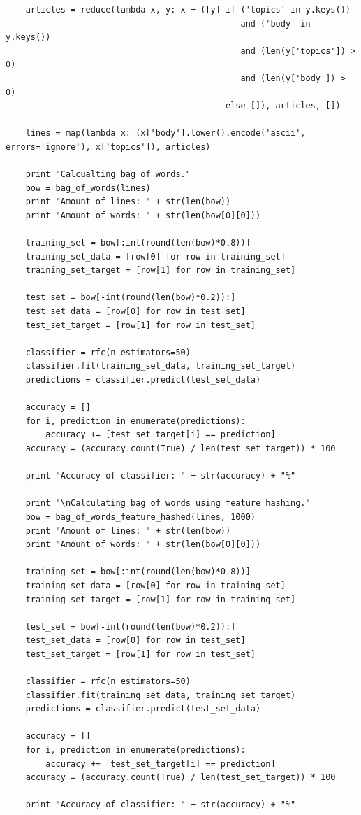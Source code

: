 \documentclass{article}
\begin{document}
\begin{lstlisting}
    articles = reduce(lambda x, y: x + ([y] if ('topics' in y.keys())
                                               and ('body' in y.keys())
                                               and (len(y['topics']) > 0)
                                               and (len(y['body']) > 0)
                                            else []), articles, [])

    lines = map(lambda x: (x['body'].lower().encode('ascii', errors='ignore'), x['topics']), articles)

    print "Calcualting bag of words."
    bow = bag_of_words(lines)
    print "Amount of lines: " + str(len(bow))
    print "Amount of words: " + str(len(bow[0][0]))

    training_set = bow[:int(round(len(bow)*0.8))]
    training_set_data = [row[0] for row in training_set]
    training_set_target = [row[1] for row in training_set]

    test_set = bow[-int(round(len(bow)*0.2)):]
    test_set_data = [row[0] for row in test_set]
    test_set_target = [row[1] for row in test_set]

    classifier = rfc(n_estimators=50)
    classifier.fit(training_set_data, training_set_target)
    predictions = classifier.predict(test_set_data)

    accuracy = []
    for i, prediction in enumerate(predictions):
        accuracy += [test_set_target[i] == prediction]
    accuracy = (accuracy.count(True) / len(test_set_target)) * 100

    print "Accuracy of classifier: " + str(accuracy) + "%"

    print "\nCalculating bag of words using feature hashing."
    bow = bag_of_words_feature_hashed(lines, 1000)
    print "Amount of lines: " + str(len(bow))
    print "Amount of words: " + str(len(bow[0][0]))

    training_set = bow[:int(round(len(bow)*0.8))]
    training_set_data = [row[0] for row in training_set]
    training_set_target = [row[1] for row in training_set]

    test_set = bow[-int(round(len(bow)*0.2)):]
    test_set_data = [row[0] for row in test_set]
    test_set_target = [row[1] for row in test_set]

    classifier = rfc(n_estimators=50)
    classifier.fit(training_set_data, training_set_target)
    predictions = classifier.predict(test_set_data)

    accuracy = []
    for i, prediction in enumerate(predictions):
        accuracy += [test_set_target[i] == prediction]
    accuracy = (accuracy.count(True) / len(test_set_target)) * 100

    print "Accuracy of classifier: " + str(accuracy) + "%"
\end{lstlisting}
\end{document}
